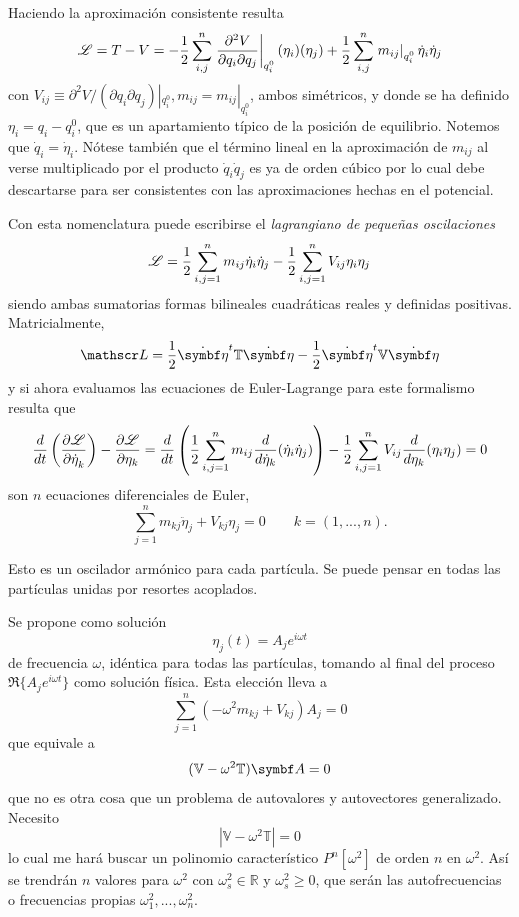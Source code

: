 \documentclass[10pt,oneside]{CBFT_book}
\begin{document}

Haciendo la aproximación consistente resulta 
\[
	\Lag = T - V = - \frac{1}{2} \sum_{i,j}^n \left. \dparcru{V}{q_j}{q_i}\right|_{q_i^0}(\eta_i)(\eta_j) +
		\frac{1}{2} \sum_{i,j}^n \left. m_{ij}\right|_{q_i^0} \dot{\eta}_i \dot{\eta}_j
\]
con $V_{ij} \equiv \partial^2 V / ( \partial q_i \partial q_j ) |_{q_i^0}, m_{ij} = m_{ij}|_{q_i^0}$, ambos simétricos, 
y donde se ha definido $\eta_i = q_i - q_i^0$, que es un apartamiento típico de la posición de equilibrio. 
Notemos que $\dot{q}_i = \dot{\eta}_i $. Nótese también que el término lineal en
la aproximación de $m_{ij}$ al verse multiplicado por el producto $\dot{q}_i\dot{q}_j$ es ya de orden cúbico por lo cual debe
descartarse para ser consistentes con las aproximaciones hechas en el potencial.

Con esta nomenclatura puede escribirse el {\it lagrangiano de pequeñas oscilaciones}
\[
	\Lag = \frac{1}{2} \sum_{i,j=1}^n m_{ij} \dot{\eta}_i \dot{\eta}_j - \frac{1}{2} \sum_{i,j=1}^n V_{ij} \eta_i \eta_j
\]
siendo ambas sumatorias formas bilineales cuadráticas reales y definidas positivas. Matricialmente,
\[
	\Lag = \frac{1}{2} \dot{\vb{\eta}}^t \mathbb{T} \dot{\vb{\eta}} - \frac{1}{2} \dot{\vb{\eta}}^t \mathbb{V} \dot{\vb{\eta}}
\]
y si ahora evaluamos las ecuaciones de Euler-Lagrange para este formalismo resulta que 
\[
	\frac{d}{dt}\left( \dpar{\Lag}{\dot{\eta}_k} \right) - \dpar{\Lag}{\eta_k} = 
		\frac{d}{dt} \left( \frac{1}{2} \sum_{i,j=1}^n m_{ij} \frac{d}{d\dot{\eta}_k}(\dot{\eta}_i \dot{\eta}_j) \right) - 
		\frac{1}{2} \sum_{i,j=1}^n V_{ij} \frac{d}{d\eta_k} (\eta_i \eta_j) = 0
\]
son $n$ ecuaciones diferenciales de Euler, 
\[
	\sum_{j=1}^n m_{kj} \ddot{\eta}_j + V_{kj} \eta_j = 0 \qquad k=(1,...,n).
\]

Esto es un oscilador armónico para cada partícula. Se puede pensar en todas las partículas unidas por resortes acoplados.

Se propone como solución 
\[
	\eta_j(t)  = A_j e^{i\omega t}
\]
de frecuencia $\omega$, idéntica para todas las partículas, tomando al final del proceso $\Re\{A_j e^{i\omega t}\}$ como 
solución física. Esta elección lleva a
\[
	\sum_{j=1}^n ( - \omega^2 m_{kj} + V_{kj} ) A_j = 0
\]
que equivale a
\[
	(\mathbb{V} -\omega^2\mathbb{T})\vb{A} = 0
\]
que no es otra cosa que un problema de autovalores y autovectores generalizado. Necesito
\[
	\left| \mathbb{V} -\omega^2\mathbb{T} \right| = 0
\]
lo cual me hará buscar un polinomio característico $P^n[\omega^2]$ de orden $n$ en $\omega^2$.
Así se trendrán $n$ valores para $\omega^2$ con $\omega^2_s \in \mathbb{R}$ y $\omega^2_s \geq 0$, que serán las
autofrecuencias o frecuencias propias $\omega^2_1, ...,\omega^2_n$. 
\end{document}

